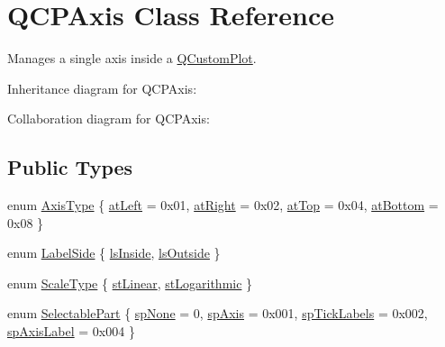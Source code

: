 \hypertarget{classQCPAxis}{}\section{Q\+C\+P\+Axis Class Reference}
\label{classQCPAxis}


Manages a single axis inside a \hyperlink{classQCustomPlot}{Q\+Custom\+Plot}.  




Inheritance diagram for Q\+C\+P\+Axis\+:


Collaboration diagram for Q\+C\+P\+Axis\+:
\subsection*{Public Types}
\begin{DoxyCompactItemize}
\item 
enum \hyperlink{classQCPAxis_ae2bcc1728b382f10f064612b368bc18a}{Axis\+Type} \{ \hyperlink{classQCPAxis_ae2bcc1728b382f10f064612b368bc18aaf84aa6cac6fb6099f54a2cbf7546b730}{at\+Left} = 0x01, 
\hyperlink{classQCPAxis_ae2bcc1728b382f10f064612b368bc18aadf5509f7d29199ef2f263b1dd224b345}{at\+Right} = 0x02, 
\hyperlink{classQCPAxis_ae2bcc1728b382f10f064612b368bc18aac0ece2b680d3f545e701f75af1655977}{at\+Top} = 0x04, 
\hyperlink{classQCPAxis_ae2bcc1728b382f10f064612b368bc18aa220d68888516b6c3b493d144f1ba438f}{at\+Bottom} = 0x08
 \}
\item 
enum \hyperlink{classQCPAxis_a24b13374b9b8f75f47eed2ea78c37db9}{Label\+Side} \{ \hyperlink{classQCPAxis_a24b13374b9b8f75f47eed2ea78c37db9aae7b027ac2839cf4ad611df30236fc3f}{ls\+Inside}, 
\hyperlink{classQCPAxis_a24b13374b9b8f75f47eed2ea78c37db9a2eadb509fc0c9a8b35b85c86ec9f3c7a}{ls\+Outside}
 \}
\item 
enum \hyperlink{classQCPAxis_a36d8e8658dbaa179bf2aeb973db2d6f0}{Scale\+Type} \{ \hyperlink{classQCPAxis_a36d8e8658dbaa179bf2aeb973db2d6f0aff6e30a11a828bc850caffab0ff994f6}{st\+Linear}, 
\hyperlink{classQCPAxis_a36d8e8658dbaa179bf2aeb973db2d6f0abf5b785ad976618816dc6f79b73216d4}{st\+Logarithmic}
 \}
\item 
enum \hyperlink{classQCPAxis_abee4c7a54c468b1385dfce2c898b115f}{Selectable\+Part} \{ \hyperlink{classQCPAxis_abee4c7a54c468b1385dfce2c898b115fae0df8123a5528d5ccf87cb7794f971ea}{sp\+None} = 0, 
\hyperlink{classQCPAxis_abee4c7a54c468b1385dfce2c898b115fa8949d2c1a31eccae9be7ed32e7a1ae38}{sp\+Axis} = 0x001, 
\hyperlink{classQCPAxis_abee4c7a54c468b1385dfce2c898b115fa584e0a3dc4d064880647619f4bd4e771}{sp\+Tick\+Labels} = 0x002, 
\hyperlink{classQCPAxis_abee4c7a54c468b1385dfce2c898b115fa851e0600e0d08b4f5fee9361e3fedabd}{sp\+Axis\+Label} = 0x004
 \}
\end{DoxyCompactItemize}
